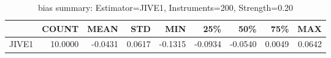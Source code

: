 \begin{table}[ht]
\centering
\caption{bias summary: Estimator=JIVE1, Instruments=200, Strength=0.20}
\begin{tabular}{lrrrrrrrr}
\toprule
 & COUNT & MEAN & STD & MIN & 25\% & 50\% & 75\% & MAX \\
\midrule
JIVE1 & 10.0000 & -0.0431 & 0.0617 & -0.1315 & -0.0934 & -0.0540 & 0.0049 & 0.0642 \\
\bottomrule
\end{tabular}
\end{table}
